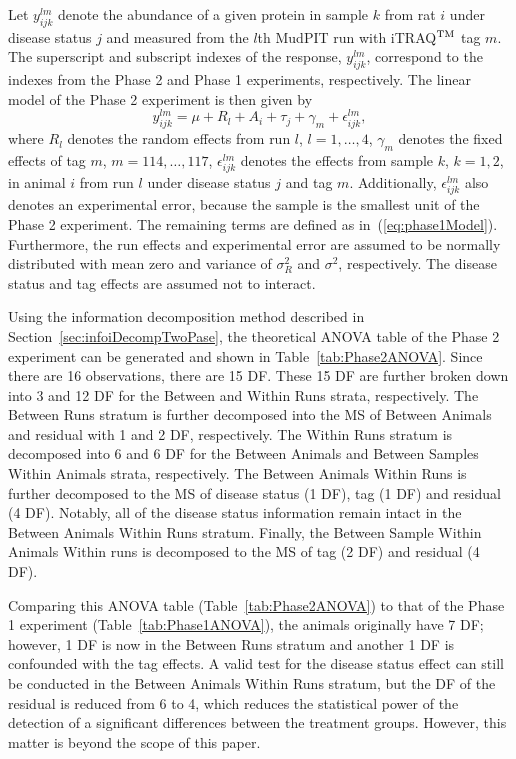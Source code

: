 \documentclass[article]{jss}
\begin{document}
Let $y_{ijk}^{lm}$ denote the abundance of a given protein in sample $k$ from rat $i$ under disease status $j$ and measured from the $l$th MudPIT run with iTRAQ$^{\rm TM}$ tag $m$. The superscript and subscript indexes of the response, $y_{ijk}^{lm}$, correspond to the indexes from the Phase 2 and Phase 1 experiments, respectively. The linear model of the Phase 2 experiment is then given by
\begin{equation}\label{eq:phase2Model}
y_{ijk}^{lm}= \mu + R_{l} + A_{i}+ \tau_{j} + \gamma_{m} + \epsilon_{ijk}^{lm},
\end{equation}
where $R_{l}$ denotes the random effects from run $l$,  $l=1,\dots, 4$, $\gamma_{m}$ denotes the fixed effects of tag $m$, $m = 114,\dots, 117$, $\epsilon_{ijk}^{lm}$ denotes the effects from sample $k$, $k = 1, 2$, in animal $i$ from run $l$ under disease status $j$ and tag $m$. Additionally, $\epsilon_{ijk}^{lm}$ also denotes an experimental error, because the sample is the smallest unit of the Phase 2 experiment. The remaining terms are defined as in~(\ref{eq:phase1Model}). Furthermore, the run effects and experimental error are assumed to be normally distributed with mean zero and variance of $\sigma_{R}^2$ and $\sigma^2$, respectively. The disease status and tag effects are assumed not to interact. 

Using the information decomposition method described in Section~\ref{sec:infoiDecompTwoPase}, the theoretical ANOVA table of the Phase 2 experiment can be generated and shown in Table~\ref{tab:Phase2ANOVA}. Since there are 16 observations, there are 15 DF. These 15 DF are further broken down into 3 and 12 DF for the Between and Within Runs strata, respectively. The Between Runs stratum is further decomposed into the MS of Between Animals and residual with 1 and 2 DF, respectively. The Within Runs stratum is decomposed into 6 and 6 DF for the Between Animals and Between Samples Within Animals strata, respectively. The Between Animals Within Runs is further decomposed to the MS of disease status (1 DF), tag (1 DF) and residual (4 DF). Notably, all of the disease status information remain intact in the Between Animals Within Runs stratum. Finally, the Between Sample Within Animals Within runs is decomposed to the MS of tag (2 DF) and residual (4 DF).

Comparing this ANOVA table (Table~\ref{tab:Phase2ANOVA}) to that of the Phase 1 experiment (Table~\ref{tab:Phase1ANOVA}), the animals originally have 7 DF; however, 1 DF is now in the Between Runs stratum and another 1 DF is confounded with the tag effects. A valid test for the disease status effect can still be conducted in the Between Animals Within Runs stratum, but the DF of the residual is reduced from 6 to 4, which reduces the statistical power of the detection of a significant differences between the treatment groups. However, this matter is beyond the scope of this paper. 
\end{document}
